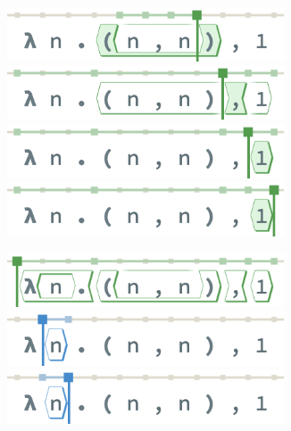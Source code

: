 \begin{figure}
\begin{subfigure}[c]{0.49\columnwidth}
      \includegraphics[width=0.9\textwidth]{img/pan-terms-7.png}
      \includegraphics[width=0.9\textwidth]{img/pan-terms-8.png}
      \includegraphics[width=0.9\textwidth]{img/pan-terms-9.png}
      \includegraphics[width=0.9\textwidth]{img/pan-terms-10.png}
      \caption{}
      \label{fig:pan-term-view}
  \end{subfigure}
  \begin{subfigure}[c]{0.49\columnwidth}
    \centering
    \includegraphics[width=0.9\textwidth]{img/pan-tiles-0.png}
    \includegraphics[width=0.9\textwidth]{img/pan-tiles-1.png}
    \includegraphics[width=0.9\textwidth]{img/pan-tiles-2.png}

\end{subfigure}
\end{figure}
